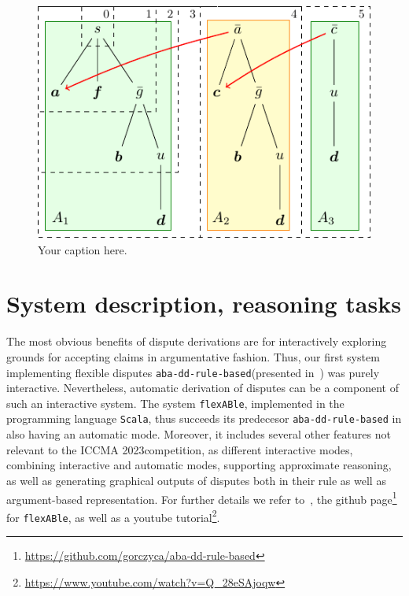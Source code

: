 \documentclass[conference]{IEEEtran}
\newcommand{\abaddrule}{\texttt{aba-dd-rule-based}\xspace}
\newcommand{\flexable}{\texttt{flexABle}\xspace}
\newcommand{\scala}{\texttt{Scala}\xspace}
\newcommand{\iccma}{ICCMA 2023}
\begin{document}
\begin{figure}
    \centering
      \centering
      \includegraphics[scale=0.8]{diagrams/diagram.pdf}
      \caption{Your caption here.}

    \label{fig:diagrams}
  \end{figure}




\section{System description, reasoning tasks}

The most obvious benefits of dispute derivations are for interactively exploring grounds for accepting claims in argumentative fashion.  Thus, our first system implementing flexible disputes \abaddrule (presented in~\cite{DillerGG21}) was purely interactive.  Nevertheless, automatic derivation of disputes can be a component of such an interactive system. The system \flexable, implemented in the programming language \scala, thus succeeds its predecesor \abaddrule in also having an automatic mode. Moreover, it includes several other features not relevant to the \iccma competition, as different interactive modes, combining interactive and automatic modes, supporting approximate reasoning, as well as generating graphical outputs of disputes both in their rule as well as argument-based representation.  For further details we refer to~\cite{gor22}, the github page\footnote{\url{https://github.com/gorczyca/aba-dd-rule-based}} for \flexable, as well as a youtube tutorial\footnote{\url{https://www.youtube.com/watch?v=Q_28eSAjoqw}}.
\end{document}
